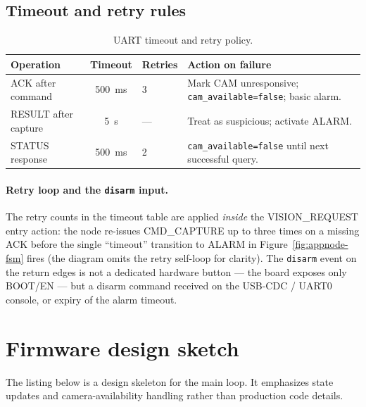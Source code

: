 \documentclass[11pt,a4paper]{article}
\begin{document}
\subsection{Timeout and retry rules}

\begin{table}[H]
    \centering
    \caption{UART timeout and retry policy.}
    \begin{tabular}{@{}l c l >{\raggedright\arraybackslash}p{4.5cm}@{}}
        \toprule
        \textbf{Operation} & \textbf{Timeout} & \textbf{Retries} & \textbf{Action on failure} \\
        \midrule
        ACK after command & 500~ms & 3 & Mark CAM unresponsive; \texttt{cam\_available=false}; basic alarm. \\
        RESULT after capture & 5~s & --- & Treat as suspicious; activate ALARM. \\
        STATUS response & 500~ms & 2 & \texttt{cam\_available=false} until next successful query. \\
        \bottomrule
    \end{tabular}
\end{table}

\paragraph{Retry loop and the \texttt{disarm} input.}  The retry counts in the
timeout table are applied \emph{inside} the VISION\_REQUEST entry action: the node
re-issues CMD\_CAPTURE up to three times on a missing ACK before the single
``timeout'' transition to ALARM in Figure~\ref{fig:appnode-fsm} fires (the diagram
omits the retry self-loop for clarity).  The \texttt{disarm} event on the return
edges is not a dedicated hardware button --- the board exposes only BOOT/EN --- but
a disarm command received on the USB-CDC / UART0 console, or expiry of the alarm
timeout.

\section{Firmware design sketch}
\label{sec:sketch}

The listing below is a design skeleton for the main loop.  It emphasizes state
updates and camera-availability handling rather than production code details.
\end{document}
